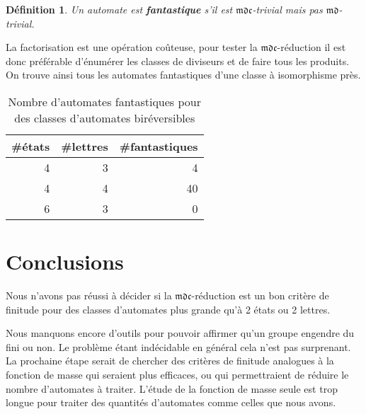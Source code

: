 \documentclass[11pt,a4paper]{article}
\newtheorem{definition}{Définition}
\begin{document}
\begin{definition}
  Un automate est \textbf{\textit{fantastique}} s'il est $\mathfrak{mdc}$-trivial mais pas $\mathfrak{md}$-trivial.
\end{definition}

La factorisation est une opération coûteuse, pour tester la $\mathfrak{mdc}$-réduction il est donc préférable d'énumérer les classes de diviseurs et de faire tous les produits. On trouve ainsi tous les automates fantastiques d'une classe à isomorphisme près.

\begin{table}[h!]
  \begin{center}
    \begin{threeparttable}
      \begin{tabular}{|rrr|}
        \hline
        \#états & \#lettres & \#fantastiques \\ [0.5ex]
        \hline\hline
        \hline
        4 & 3 & 4 \\
        \hline
        4 & 4 & 40 \\
        \hline
        6 & 3 & 0 \\
        \hline
      \end{tabular}
      \caption{Nombre d'automates fantastiques pour des classes d'automates biréversibles}
    \end{threeparttable}
  \end{center}
\end{table}

\section{Conclusions}

Nous n'avons pas réussi à décider si la $\mathfrak{mdc}$-réduction est un bon critère de finitude pour des classes d'automates plus grande qu'à 2 états ou 2 lettres.

Nous manquons encore d’outils pour pouvoir affirmer qu’un groupe engendre du fini ou non. Le problème étant indécidable en général cela n’est pas surprenant. La prochaine étape serait de chercher des critères de finitude analogues à la fonction de masse qui seraient plus efficaces, ou qui permettraient de réduire le nombre d'automates à traiter. L’étude de la fonction de masse seule est trop longue pour traiter des quantités d’automates comme celles que nous avons.

\newpage
{
  \nocite{*}
}

\end{document}
